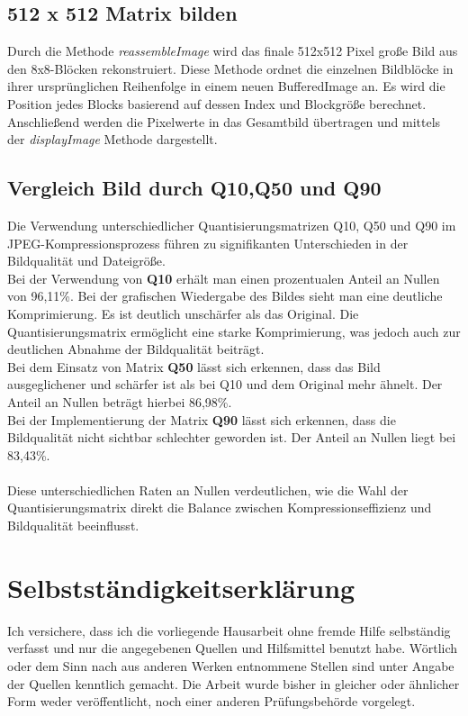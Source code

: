 \documentclass[12pt]{article}
\begin{document}
	\subsection{512 x 512 Matrix bilden}	
Durch die Methode \textit{reassembleImage} wird das finale 512x512 Pixel große Bild aus den 8x8-Blöcken rekonstruiert. Diese Methode ordnet die einzelnen Bildblöcke in ihrer ursprünglichen Reihenfolge in einem neuen BufferedImage an. Es wird die Position jedes Blocks basierend auf dessen Index und Blockgröße berechnet. Anschließend werden die Pixelwerte in das Gesamtbild übertragen und mittels der \textit{displayImage} Methode dargestellt. \\

\subsection{Vergleich Bild durch Q10,Q50 und Q90}
Die Verwendung unterschiedlicher Quantisierungsmatrizen Q10, Q50 und Q90 im JPEG-Kompressionsprozess führen zu signifikanten Unterschieden in der Bildqualität und Dateigröße. \\
Bei der Verwendung von \textbf{Q10} erhält man einen prozentualen Anteil an Nullen von 96,11\%. Bei der grafischen Wiedergabe des Bildes sieht man eine deutliche Komprimierung. Es ist deutlich unschärfer als das Original. Die Quantisierungsmatrix ermöglicht eine starke Komprimierung, was jedoch auch zur deutlichen Abnahme der Bildqualität beiträgt. \\
Bei dem Einsatz von Matrix \textbf{Q50} lässt sich erkennen, dass das Bild ausgeglichener und schärfer ist als bei Q10 und dem Original mehr ähnelt. Der Anteil an Nullen beträgt hierbei 86,98\%. \\
Bei der Implementierung der Matrix \textbf{Q90} lässt sich erkennen, dass die Bildqualität nicht sichtbar schlechter geworden ist. Der Anteil an Nullen liegt bei 83,43\%. \\\\
Diese unterschiedlichen Raten an Nullen verdeutlichen, wie die Wahl der Quantisierungsmatrix direkt die Balance zwischen Kompressionseffizienz und Bildqualität beeinflusst.

\newpage
		
		\section{Selbstständigkeitserklärung}
		Ich versichere, dass ich die vorliegende Hausarbeit ohne
		fremde Hilfe selbständig verfasst und nur die angegebenen Quellen und Hilfsmittel
		benutzt habe. Wörtlich oder dem Sinn nach aus anderen Werken entnommene Stellen
		sind unter Angabe der Quellen kenntlich gemacht. Die Arbeit wurde bisher in gleicher
		oder ähnlicher Form weder veröffentlicht, noch einer anderen Prüfungsbehörde
		vorgelegt. 
		\vspace{16cm}
		
\end{document}
